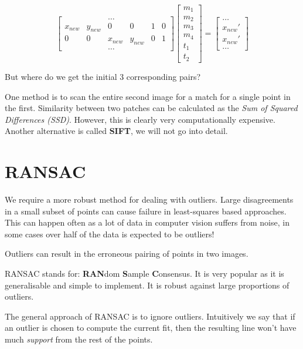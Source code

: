 \documentclass{article}
\begin{document}
\[
  \begin{bmatrix}
    & & \ldots & & & \\
    x_{new} & y_{new} & 0 & 0 & 1 & 0 \\
    0 & 0 & x_{new} & y_{new} & 0 & 1 \\
     & & \ldots & & &
   \end{bmatrix}
   \begin{bmatrix}
     m_{1} \\ m_{2} \\ m_{3} \\ m_{4} \\ t_{1} \\ t_{2}
   \end{bmatrix}=
   \begin{bmatrix}
     \ldots \\ x_{new}' \\ x_{new}' \\ \ldots
   \end{bmatrix}
 \]

 But where do we get the initial 3 corresponding pairs?

 One method is to scan the entire second image for a match for a single point in the first. Similarity between two patches can be calculated as the \textit{Sum of Squared Differences (SSD)}. However, this is clearly very computationally expensive. Another alternative is called \textbf{SIFT}, we will not go into detail.

 \section{RANSAC}

 We require a more robust method for dealing with outliers. Large disagreements in a small subset of points can cause failure in least-squares based approaches. This can happen often as a lot of data in computer vision suffers from noise, in some cases over half of the data is expected to be outliers!

 Outliers can result in the erroneous pairing of points in two images.

 RANSAC stands for: \textbf{RAN}dom \textbf{S}ample \textbf{C}onsensus. It is very popular as it is generalisable and simple to implement. It is robust against large proportions of outliers.

 The general approach of RANSAC is to ignore outliers. Intuitively we say that if an outlier is chosen to compute the current fit, then the resulting line won't have much \textit{support} from the rest of the points.
\end{document}
